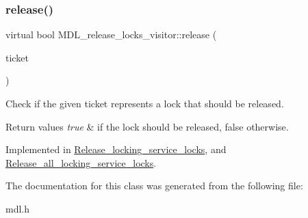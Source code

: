\subsubsection{\texorpdfstring{release()}{release()}}
{\footnotesize\ttfamily virtual bool M\+D\+L\+\_\+release\+\_\+locks\+\_\+visitor\+::release (\begin{DoxyParamCaption}\item[{\mbox{\hyperlink{classMDL__ticket}{M\+D\+L\+\_\+ticket}} $\ast$}]{ticket }\end{DoxyParamCaption})\hspace{0.3cm}{\ttfamily [pure virtual]}}

Check if the given ticket represents a lock that should be released.


\begin{DoxyRetVals}{Return values}
{\em true} & if the lock should be released, false otherwise. \\
\hline
\end{DoxyRetVals}


Implemented in \mbox{\hyperlink{classRelease__locking__service__locks_a95d3c4e147418ae0fe72017ad4068cd3}{Release\+\_\+locking\+\_\+service\+\_\+locks}}, and \mbox{\hyperlink{classRelease__all__locking__service__locks_a7578e5263f465bfc6acb3ac35d137501}{Release\+\_\+all\+\_\+locking\+\_\+service\+\_\+locks}}.



The documentation for this class was generated from the following file\+:\begin{DoxyCompactItemize}
\item 
mdl.\+h\end{DoxyCompactItemize}
